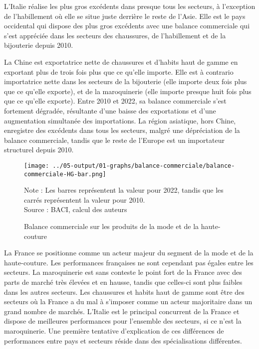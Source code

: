 \documentclass[french,10pt,a4paper]{article}
\begin{document}
L'Italie réalise les plus gros excédents dans presque tous les secteurs, à l'exception de l'habillement où elle se situe juste derrière le reste de l'Asie. Elle est le pays occidental qui dispose des plus gros excédents avec une balance commerciale qui s'est appréciée dans les secteurs des chaussures, de l'habillement et de la bijouterie depuis 2010.

La Chine est exportatrice nette de chaussures et d'habits haut de gamme en exportant plus de trois fois plus que ce qu'elle importe. Elle est à contrario importatrice nette dans les secteurs de la bijouterie (elle importe deux fois plus que ce qu'elle exporte), et de la maroquinerie (elle importe presque huit fois plus que ce qu'elle exporte). Entre 2010 et 2022, sa balance commerciale s'est fortement dégradée, résultante d'une baisse des exportations et d'une augmentation simultanée des importations. La région asiatique, hors Chine, enregistre des excédents dans tous les secteurs, malgré une dépréciation de la balance commerciale, tandis que le reste de l'Europe est un importateur structurel depuis 2010.

\begin{figure}[!h]
  \centering
  \texttt{[image: ../05-output/01-graphs/balance-commerciale/balance-commerciale-HG-bar.png]}
  \captionsetup{justification=justified, singlelinecheck=false, font=small}
  \caption*{Note : Les barres représentent la valeur pour 2022, tandis que les carrés représentent la valeur pour 2010. \\
  Source : BACI, calcul des auteurs}
  \captionsetup{justification=centering, singlelinecheck=true, font=normalsize}
  \caption{Balance commerciale sur les produits de la mode et de la haute-couture}
  \label{fig:balance-commerciale}
\end{figure}

\bigskip

La France se positionne comme un acteur majeur du segment de la mode et de la haute-couture. Les performances françaises ne sont cependant pas égales entre les secteurs. La maroquinerie est sans conteste le point fort de la France avec des parts de marché très élevées et en hausse, tandis que celles-ci sont plus faibles dans les autres secteurs. Les chaussures et habits haut de gamme sont être des secteurs où la France a du mal à s'imposer comme un acteur majoritaire dans un grand nombre de marchés. L'Italie est le principal concurrent de la France et dispose de meilleures performances pour l'ensemble des secteurs, si ce n'est la maroquinerie. Une première tentative d'explication de ces différences de performances entre pays et secteurs réside dans des spécialisations différentes.
\end{document}
